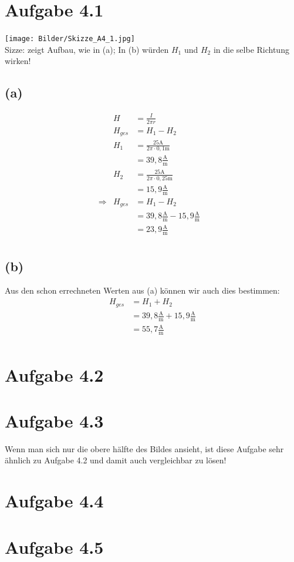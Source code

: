 \documentclass[]{article}
\newcommand{\rarr}{\Rightarrow}
\newcommand{\unit}[1]{\text{#1}}
\newcommand{\fracunit}[2]{\frac{\unit{#1}}{\unit{#2}}}
\begin{document}
\section*{Aufgabe 4.1}
\par
	\texttt{[image: Bilder/Skizze\_A4\_1.jpg]}\\
	Sizze: zeigt Aufbau, wie in (a); In (b) würden $H_1$ und $H_2$ in die selbe Richtung wirken!
\subsection*{(a)}
	\begin{align*}
		&& H&= \frac{I}{2\pi r} &&\\
		&& H_{ges} &= H_1 - H_2 &&\\
		&& H_1 &= \frac{25\unit{A}}{2\pi \cdot 0,1\unit{m}}&&\\
		&& &= 39,8 \fracunit{A}{m}&&\\
		&& H_2 &= \frac{25\unit{A}}{2\pi \cdot 0,25\unit{m}}&&\\
		&& &= 15,9 \fracunit{A}{m}&&\\
		&\rarr& H_{ges} &= H_1 - H_2&&\\
		&& &= 39,8 \fracunit{A}{m} - 15,9 \fracunit{A}{m}&&\\
		&& &= 23,9 \fracunit{A}{m}&&\\
	\end{align*}
\subsection*{(b)}
	Aus den schon errechneten Werten aus (a) können wir auch dies bestimmen:
	\begin{align*}
		&& H_{ges} &= H_1 + H_2 &&\\
		&& &= 39,8 \fracunit{A}{m} + 15,9 \fracunit{A}{m}&&\\
		&& &= 55,7 \fracunit{A}{m}&&\\
	\end{align*}
\section*{Aufgabe 4.2}
\par
\section*{Aufgabe 4.3}
\par
Wenn man sich nur die obere hälfte des Bildes ansieht, ist diese Aufgabe sehr ähnlich zu Aufgabe 4.2 und damit auch vergleichbar zu lösen!
\section*{Aufgabe 4.4}
\par
\section*{Aufgabe 4.5}
\par
\end{document}
